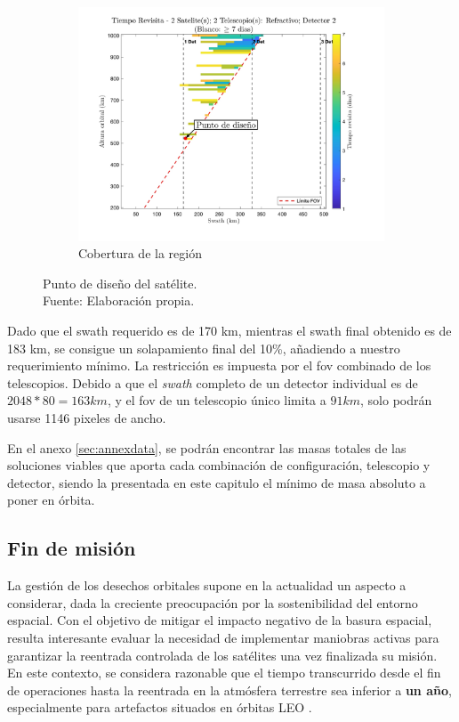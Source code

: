 \begin{figure}[H]
    \hfill
    \begin{subfigure}[b]{0.33\textwidth}
        \centering
        \includegraphics[width=\textwidth]{5.Mission/TFG_Tikz-6.jpg}
        \caption{Cobertura de la región}
        \label{fig:sub3}
    \end{subfigure}
    \caption{Punto de diseño del satélite. \\ Fuente: Elaboración propia.}
    \label{fig:puntodiseno}
\end{figure}

Dado que el swath requerido es de 170 km, mientras el swath final obtenido es de 183 km, se consigue un solapamiento final del 10\%, añadiendo a nuestro requerimiento mínimo. La restricción es impuesta por el fov combinado de los telescopios. Debido a que el \textit{swath} completo de un detector individual es de $2048*80= 163 km$, y el fov de un telescopio único limita a $ 91 km$, solo podrán usarse 1146 pixeles de ancho.

En el anexo \ref{sec:annexdata}, se podrán encontrar las masas totales de las soluciones viables que aporta cada combinación de configuración, telescopio y detector, siendo la presentada en este capitulo el mínimo de masa absoluto a poner en órbita.


\subsection{Fin de misión}

La gestión de los desechos orbitales supone en la actualidad un aspecto a considerar, dada la creciente preocupación por la sostenibilidad del entorno espacial. Con el objetivo de mitigar el impacto negativo de la basura espacial, resulta interesante evaluar la necesidad de implementar maniobras activas para garantizar la reentrada controlada de los satélites una vez finalizada su misión. En este contexto, se considera razonable que el tiempo transcurrido desde el fin de operaciones hasta la reentrada en la atmósfera terrestre sea inferior a \textbf{un año}, especialmente para artefactos situados en órbitas LEO \cite{nasa_deorbit_systems_2025}.


